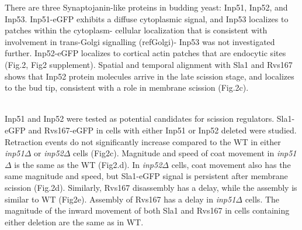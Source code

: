 \documentclass[9pt,lineno]{elife}
\begin{document}


There are three Synaptojanin-like proteins in budding yeast: Inp51, Inp52, and Inp53. Inp51-eGFP exhibits a diffuse cytoplasmic signal, and Inp53 localizes to patches within the cytoplasm- cellular localization that is consistent with involvement in trans-Golgi signalling (refGolgi)- Inp53 was not investigated further. Inp52-eGFP localizes to cortical actin patches that are endocytic sites (Fig.2, Fig2 supplement). Spatial and temporal alignment with Sla1 and Rvs167 shows that Inp52 protein molecules arrive in the late scission stage, and localizes to the bud tip, consistent with a role in membrane scission (Fig.2c). 

~\\

Inp51 and Inp52 were tested as potential candidates for scission regulators. Sla1-eGFP and Rvs167-eGFP in cells with either Inp51 or  Inp52 deleted were studied. Retraction events do not significantly increase compared to the WT in either \textit{inp51$\Delta$} or \textit{inp52$\Delta$} cells (Fig2c). Magnitude and speed of coat movement in  \textit{inp51$\Delta$} is the same as the WT (Fig2.d). In  \textit{inp52$\Delta$} cells, coat movement also has the same magnitude and speed, but Sla1-eGFP signal is persistent after membrane scission (Fig.2d). Similarly, Rvs167 disassembly has a delay, while the assembly is similar to WT (Fig2e). Assembly of Rvs167 has a delay in \textit{inp51$\Delta$} cells. The magnitude of the inward movement of both Sla1 and Rvs167 in cells containing either deletion are the same as in WT. 


\end{document}
